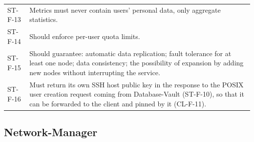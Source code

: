 \begin{longtable}{p{2.6cm} p{\dimexpr\linewidth-2.6cm-4\tabcolsep\relax}}
ST-F-13 & Metrics must never contain users' personal data, only aggregate statistics. \\
ST-F-14 & Should enforce per-user quota limits. \\
ST-F-15 & Should guarantee: automatic data replication; fault tolerance for at least one node; data consistency; the possibility of expansion by adding new nodes without interrupting the service. \\
ST-F-16 & Must return its own SSH host public key in the response to the POSIX user creation request coming from Database-Vault (ST-F-10), so that it can be forwarded to the client and pinned by it (CL-F-11). \\
\end{longtable}

\subsection{Network-Manager}

